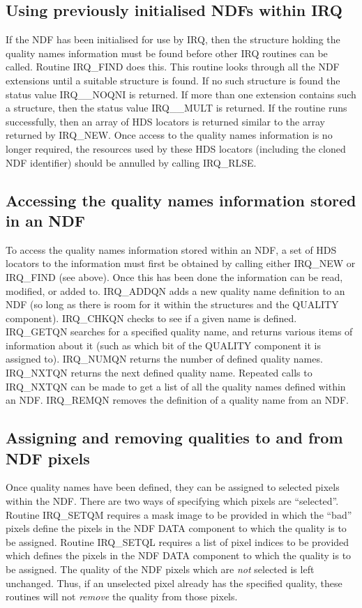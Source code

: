 \subsection{Using previously initialised NDFs within IRQ}
If the NDF has been initialised for use by IRQ, then the structure holding the
quality names information must be found before other IRQ routines can be called.
Routine IRQ\_FIND does this. This routine looks through all the NDF extensions
until a suitable structure is found. If no such structure is found the status
value IRQ\_\_NOQNI is returned. If more than one extension contains such a
structure, then the status value IRQ\_\_MULT is returned. If the routine runs
successfully, then an array of HDS locators is returned similar to the array
returned by IRQ\_NEW. Once access to the quality names information is no longer
required, the resources used by these HDS locators (including the cloned
NDF identifier) should be annulled by calling IRQ\_RLSE. 

\subsection{Accessing the quality names information stored in an NDF}
To access the quality names information stored within an NDF, a set of HDS 
locators to the information must first be obtained by calling either IRQ\_NEW or 
IRQ\_FIND (see above). Once this has been done the information can be read, 
modified, or added to. IRQ\_ADDQN adds a new quality name definition to an NDF 
(so long as there is room for it within the structures and the QUALITY 
component). IRQ\_CHKQN checks to see if a given name is defined. IRQ\_GETQN 
searches for a specified quality name, and 
returns various items of information about it (such as which bit of the QUALITY 
component it is assigned to). IRQ\_NUMQN returns the number of defined quality 
names. IRQ\_NXTQN returns the next defined quality name. Repeated calls to 
IRQ\_NXTQN can be made to get a list of all the quality names defined within an 
NDF. IRQ\_REMQN removes the definition of a quality name from an NDF.

\subsection{Assigning and removing qualities to and from NDF pixels}
Once quality names have been defined, they can be assigned to selected pixels
within the NDF. There are two ways of specifying which pixels are ``selected''.
Routine IRQ\_SETQM requires a mask image to be provided in which the ``bad''
pixels define the pixels in the NDF DATA component to which the quality is to be
assigned. Routine IRQ\_SETQL requires a list of pixel indices to be provided
which defines the pixels in the NDF DATA component to which the quality is to be
assigned. The quality of the NDF pixels which are {\em not} selected is left
unchanged. Thus, if an unselected pixel already has the specified quality, these
routines will not {\em remove} the quality from those pixels. 

